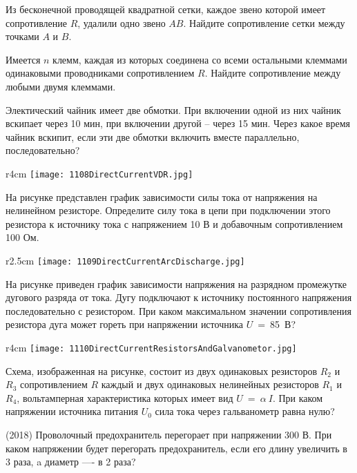 \AddProb Из бесконечной проводящей квадратной сетки, каждое звено которой имеет сопротивление $R$, удалили одно звено $AB$. 
Найдите сопротивление сетки между точками $A$ и $B$.

\AddProb Имеется $n$ клемм, каждая из которых соединена со всеми остальными клеммами одинаковыми проводниками сопротивлением $R$. 
Найдите сопротивление между любыми двумя клеммами.

\AddProb Электический чайник имеет две обмотки. При включении одной из них чайник вскипает через 10 мин, при включении другой -- через 15 мин. 
Через какое время чайник вскипит, если эти две обмотки включить вместе параллельно, последовательно?

\begin{wrapfigure}{r}{4cm}
\texttt{[image: 1108DirectCurrentVDR.jpg]}
\end{wrapfigure}

\AddProb На рисунке представлен график зависимости силы тока от напряжения на нелинейном резисторе. 
Определите силу тока в цепи при подключении этого резистора к источнику тока с напряжением 10 В и добавочным сопротивлением 100 Ом.

\begin{wrapfigure}{r}{2.5cm}
\texttt{[image: 1109DirectCurrentArcDischarge.jpg]}
\end{wrapfigure}

\AddProb На рисунке приведен график зависимости напряжения на разрядном промежутке дугового разряда от тока. 
Дугу подключают  к источнику постоянного напряжения последовательно с резистором. 
При каком максимальном значении сопротивления резистора дуга может гореть при напряжении источника $U$~=~85~В?

\begin{wrapfigure}{r}{4cm}
\texttt{[image: 1110DirectCurrentResistorsAndGalvanometor.jpg]}
\end{wrapfigure}

\AddProb Схема, изображенная на рисунке, состоит из двух одинаковых резисторов $R_2$ и $R_3$ сопротивлением $R$ каждый 
и двух одинаковых нелинейных резисторов $R_1$ и $R_4$, вольтамперная характеристика которых имеет вид $U~=~\alpha~I$. 
При каком напряжении источника питания $U_0$ сила тока через гальванометр равна нулю?

\AddProb (2018) Проволочный предохранитель перегорает при напряжении 300 В. При каком напряжении будет перегорать предохранитель, если его длину увеличить в 3 раза, a диаметр —- в 2 раза?